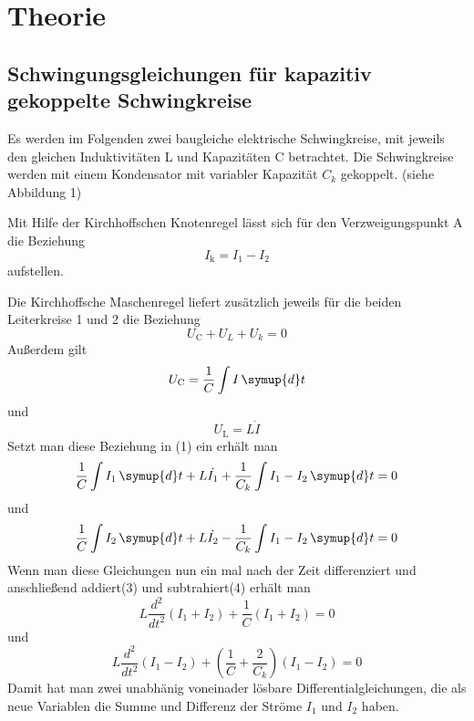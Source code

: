 \section{Theorie}
\label{sec:Theorie}

\subsection{Schwingungsgleichungen für kapazitiv gekoppelte Schwingkreise}
Es werden im Folgenden zwei baugleiche elektrische Schwingkreise, mit jeweils den gleichen Induktivitäten L und Kapazitäten C betrachtet. Die Schwingkreise werden mit 
einem Kondensator mit variabler Kapazität $ C_k $ gekoppelt. (siehe Abbildung 1)



Mit Hilfe der Kirchhoffschen Knotenregel lässt sich für den Verzweigungspunkt A die Beziehung
\begin{equation}
    I_\text{k} = I_1 - I_2
    \label{eqn:Knotenregel}
\end{equation}
aufstellen.

Die Kirchhoffsche Maschenregel liefert zusätzlich jeweils für die beiden Leiterkreise 1 und 2 die Beziehung
\begin{equation}
    U_\text{C} + U_L + U_k = 0
    \label{eqn:Maschenregel}
\end{equation}
Außerdem gilt
\begin{equation}
    U_\text{C} = \frac{1}{C} \int I \, \symup{d}t
\end{equation}
  und
\begin{equation}
    U_\text{L} = L \dot{I}
\end{equation}
Setzt man diese Beziehung in (1) ein erhält man 
\begin{equation}
    \frac{1}{C} \int I_1 \, \symup{d}t + L \dot{I_1} + \frac{1}{C_k} \int I_1 - I_2 \, \symup{d}t = 0
\end{equation}
und
\begin{equation}
    \frac{1}{C} \int I_2 \, \symup{d}t + L \dot{I_2} - \frac{1}{C_k} \int I_1 - I_2 \, \symup{d}t = 0
\end{equation}
Wenn man diese Gleichungen nun ein mal nach der Zeit differenziert und anschließend addiert(3) und subtrahiert(4) erhält man
\begin{equation}
    L \frac{d^2}{dt^2}(I_1 + I_2) + \frac{1}{C}(I_1 +I_2) = 0
    \label{eqn:Drei}
\end{equation}
und
\begin{equation}
    L \frac{d^2}{dt^2}(I_1 - I_2) + ( \frac{1}{C} + \frac{2}{C_k} ) (I_1 - I_2) = 0
    \label{eqn:Vier}
\end{equation}
Damit hat man zwei unabhänig voneinader lösbare Differentialgleichungen, die als neue Variablen die Summe und Differenz der Ströme $ I_1 $ und $ I_2 $ haben.


